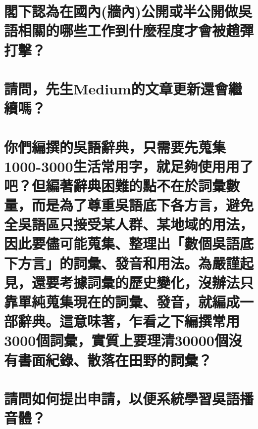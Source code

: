 \chapter[閣下認為在國內(牆內)公開或半公開做吳語相關的哪些工作到什麼程度才會被趙彈打擊？]{閣下認為在國內(牆內)公開或半公開做吳語相關的哪些工作到什麼程度才會被趙彈打擊？}

\chapter[請問，先生Medium的文章更新還會繼續嗎？]{請問，先生Medium的文章更新還會繼續嗎？}

\chapter[你們編撰的吳語辭典，只需要先蒐集1000-3000生活常用字，就足夠使用用了吧？但編著辭典困難的點不在於詞彙數量，而是為了尊重吳語底下各方言，避免全吳語區只接受某人群、某地域的用法，因此要儘可能蒐集、整理出「數個吳語底下方言」的詞彙、發音和用法。為嚴謹起見，還要考據詞彙的歷史變化，沒辦法只靠單純蒐集現在的詞彙、發音，就編成一部辭典。這意味著，乍看之下編撰常用3000個詞彙，實質上要理清30000個沒有書面紀錄、散落在田野的詞彙？]{你們編撰的吳語辭典，只需要先蒐集1000-3000生活常用字，就足夠使用用了吧？但編著辭典困難的點不在於詞彙數量，而是為了尊重吳語底下各方言，避免全吳語區只接受某人群、某地域的用法，因此要儘可能蒐集、整理出「數個吳語底下方言」的詞彙、發音和用法。為嚴謹起見，還要考據詞彙的歷史變化，沒辦法只靠單純蒐集現在的詞彙、發音，就編成一部辭典。這意味著，乍看之下編撰常用3000個詞彙，實質上要理清30000個沒有書面紀錄、散落在田野的詞彙？}

\chapter[請問如何提出申請，以便系統學習吳語播音體？]{請問如何提出申請，以便系統學習吳語播音體？}

